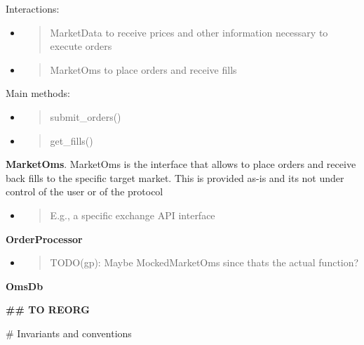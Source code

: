 \documentclass[11pt, reqno]{amsart}
\begin{document}
Interactions:

\begin{itemize}
\item
  \begin{quote}
  MarketData to receive prices and other information necessary to
  execute orders
  \end{quote}
\end{itemize}

\begin{itemize}
\item
  \begin{quote}
  MarketOms to place orders and receive fills
  \end{quote}
\end{itemize}

Main methods:

\begin{itemize}
\item
  \begin{quote}
  submit\_orders()
  \end{quote}
\item
  \begin{quote}
  get\_fills()
  \end{quote}
\end{itemize}

\textbf{MarketOms}. MarketOms is the interface that allows to place
orders and receive back fills to the specific target market. This is
provided as-is and it\textquotesingle s not under control of the user or
of the protocol

\begin{itemize}
\item
  \begin{quote}
  E.g., a specific exchange API interface
  \end{quote}
\end{itemize}

\textbf{OrderProcessor}

\begin{itemize}
\item
  \begin{quote}
  TODO(gp): Maybe MockedMarketOms since that\textquotesingle s the
  actual function?
  \end{quote}
\end{itemize}

\textbf{OmsDb}

\textbf{\#\# TO REORG}

\# Invariants and conventions
\end{document}

